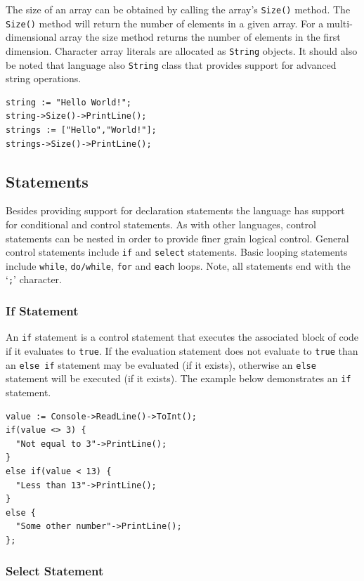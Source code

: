 \documentclass[12pt]{article}
\begin{document}
The size of an array can be obtained by calling the array's
\texttt{Size()} method.  The \texttt{Size()} method will return the
number of elements in a given array.  For a multi-dimensional array
the size method returns the number of elements in the first dimension.
Character array literals are allocated as \texttt{String} objects.  It
should also be noted that language also \texttt{String} class that
provides support for advanced string operations.

\begin{verbatim}
string := "Hello World!";
string->Size()->PrintLine();
strings := ["Hello","World!"];
strings->Size()->PrintLine();
\end{verbatim}

\subsection{Statements}
Besides providing support for declaration statements the language has
support for conditional and control statements.  As with other
languages, control statements can be nested in order to provide finer
grain logical control. General control statements include \texttt{if}
and \texttt{select} statements. Basic looping statements include
\texttt{while}, \texttt{do/while}, \texttt{for} and \texttt{each}
loops.  Note, all statements end with the `\texttt{;}' character.

\subsubsection{If Statement}

An \texttt{if} statement is a control statement that executes the
associated block of code if it evaluates to \texttt{true}.  If the
evaluation statement does not evaluate to \texttt{true} than an
\texttt{else if} statement may be evaluated (if it exists), otherwise
an \texttt{else} statement will be executed (if it exists).  The
example below demonstrates an \texttt{if} statement.

\begin{verbatim}
value := Console->ReadLine()->ToInt();
if(value <> 3) {
  "Not equal to 3"->PrintLine();
}
else if(value < 13) {
  "Less than 13"->PrintLine();
}
else {
  "Some other number"->PrintLine();
};
\end{verbatim}

\subsubsection{Select Statement}
\end{document}
